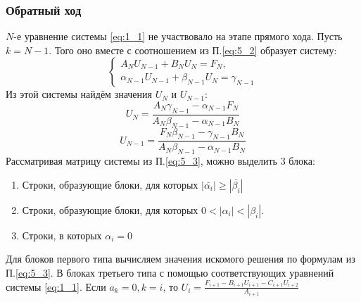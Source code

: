 \subsubsection{Обратный ход}
\(N\)-е уравнение системы \ref{eq:1_1} не участвовало на этапе прямого хода.
Пусть \(k=N-1\). Того оно вместе с соотношением из П.\ref{eq:5_2} образует систему:
\[
  \begin{cases}
    A_N U_{N-1} + B_N U_N = F_N,
    \\
    \alpha_{N-1} U_{N-1} + \beta_{N-1} U_N = \gamma_{N-1}
  \end{cases}  
\]
Из этой системы найдём значения \(U_N\) и \(U_{N-1}\):
\[
  U_N = \frac{A_N \gamma_{N-1} - \alpha_{N-1} F_N}{A_N\beta_{N-1}-\alpha_{N-1}B_N}
\]
\[
  U_{N-1} = \frac{F_N\beta_{N-1}-\gamma_{N-1}B_N}{A_N \beta_{N-1} - \alpha_{N-1}B_N}
\]
Рассматривая матрицу системы из П.\ref{eq:5_3}, можно выделить 3 блока:
\begin{enumerate}
  \item Строки, образующие блоки, для которых \(|\bar{\alpha_i}| \geq |\bar{\beta_i}|\)
  \item Строки, образующие блоки, для которых \(0<|\alpha_i|<|\beta_i|\). 
  \item Строки, в которых \(\alpha_i=0\)
\end{enumerate}

Для блоков первого типа вычисляем значения искомого решения по формулам из П.\ref{eq:5_3}.
В блоках третьего типа с помощью соответствующих уравнений системы \ref{eq:1_1}.
Если \(a_k=0, k=i\), то \(U_i=\frac{F_{i+1}-B_{i+1}U_{i+1}-C_{i+1}U_{i+2}}{A_{i+1}}\)
